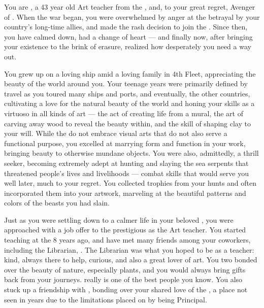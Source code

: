 \documentclass[char]{GL2020}
\begin{document}
\name{\cChupAvenger{}}

You are \cChupAvenger{\intro}, a 43 year old Art teacher from the \pShip{}, and, to your great regret, Avenger of \cGenesis{}. When the war began, you were overwhelmed by anger at the betrayal by your country's long-time allies, and made the rash decision to join the \pGoaties{}. Since then, you have calmed down, had a change of heart — and finally now, after bringing your existence to the brink of erasure, realized how desperately you need a way out.

You grew up on a loving ship amid a loving family in 4th Fleet, appreciating the beauty of the world around you. Your teenage years were primarily defined by travel as you toured many ships and ports, and eventually, the other countries, cultivating a love for the natural beauty of the world and honing your skills as a virtuoso in all kinds of art — the act of creating life from a mural, the art of carving away wood to reveal the beauty within, and the skill of shaping clay to your will. While the \pShippies{} do not embrace visual arts that do not also serve a functional purpose, you excelled at marrying form and function in your work, bringing beauty to otherwise mundane objects. You were also, admittedly, a thrill seeker, becoming extremely adept at hunting and slaying the sea serpents that threatened people’s lives and livelihoods — combat skills that would serve you well later, much to your regret. You collected trophies from your hunts and often incorporated them into your artwork, marveling at the beautiful patterns and colors of the beasts you had slain.

Just as you were settling down to a calmer life in your beloved \pShip{}, you were approached with a job offer to the prestigious \pSchool{} as the Art teacher. You started teaching at the \pSc{} 8 years ago, and have met many friends among your coworkers, including the Librarian, \cLibrarian{\full}. The Librarian was what you hoped to be as a teacher: kind, always there to help, curious, and also a great lover of art. You two bonded over the beauty of nature, especially plants, and you would always bring gifts back from your journeys. \cLibrarian{} really is one of the best people you know. You also stuck up a friendship with \cPrincipal{\full}, bonding over your shared love of the \pShippies{}, a place \cPrincipal{\theyhave} not seen in years due to the limitations placed on \cPrincipal{\them} by being Principal.
\end{document}

